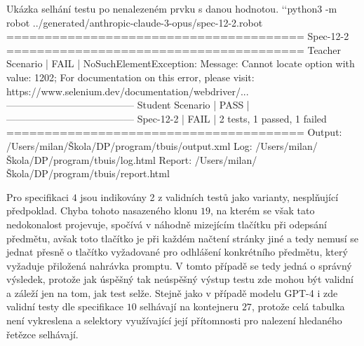 \documentclass[czech, ma, kiv, he, iso690alph, pdf, viewonly]{fasthesis}
\begin{document}
            \begin{console}{Ukázka selhání testu po nenalezeném prvku s danou hodnotou. \label{lst:value_fail}}
`\uxprompt`python3 -m robot ../generated/anthropic-claude-3-opus/spec-12-2.robot
=======================================
Spec-12-2
=======================================
Teacher Scenario                | FAIL |
NoSuchElementException: Message: Cannot locate option with value: 1202; For documentation on this error, please visit: https://www.selenium.dev/documentation/webdriver/...
---------------------------------------
Student Scenario                | PASS |
---------------------------------------
Spec-12-2                       | FAIL |
2 tests, 1 passed, 1 failed
=======================================
Output:  /Users/milan/Škola/DP/program/tbuis/output.xml
Log:     /Users/milan/Škola/DP/program/tbuis/log.html
Report:  /Users/milan/Škola/DP/program/tbuis/report.html
            \end{console}


            Pro specifikaci \(4\) jsou indikovány 2 z validních testů jako varianty, nesplňující předpoklad. Chyba tohoto nasazeného klonu \(19\), na kterém se však tato nedokonalost projevuje, spočívá v náhodně mizejícím tlačítku při odepsání předmětu, avšak toto tlačítko je při každém načtení stránky jiné a tedy nemusí se jednat přesně o tlačítko vyžadované pro odhlášení konkrétního předmětu, který vyžaduje přiložená nahrávka promptu. V tomto případě se tedy jedná o správný výsledek, protože jak úspěšný tak neúspěšný výstup testu zde mohou být validní a záleží jen na tom, jak test selže. Stejně jako v případě modelu GPT-4 i zde validní testy dle specifikace \(10\) selhávají na kontejneru \(27\), protože celá tabulka není vykreslena a selektory využívající její přítomnosti pro nalezení hledaného řetězce selhávají. 
\end{document}
